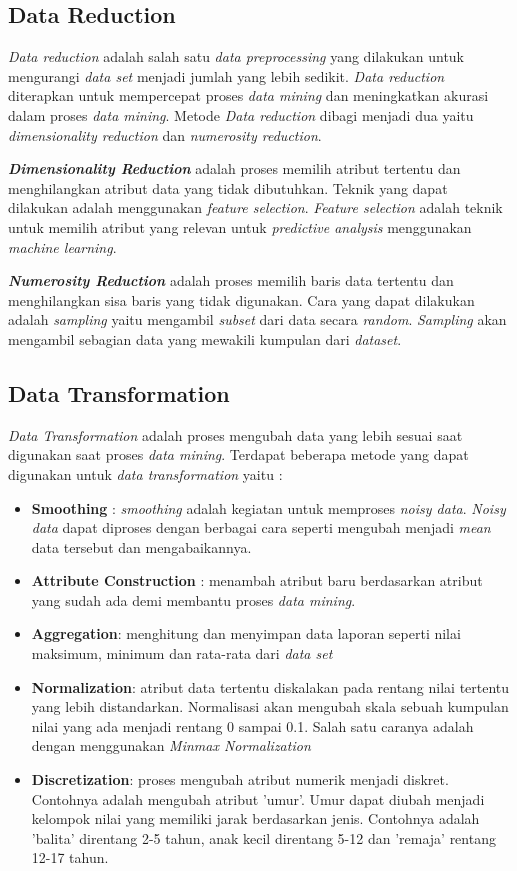 \subsection{Data Reduction} 
\label{chap:datareduction}
\textit{Data reduction} adalah salah satu \textit{data preprocessing} yang dilakukan untuk mengurangi \textit{data set} menjadi jumlah yang lebih sedikit. \textit{Data reduction} diterapkan untuk mempercepat proses \textit{data mining} dan meningkatkan akurasi dalam proses \textit{data mining}. Metode \textit{Data reduction} dibagi menjadi dua yaitu \textit{dimensionality reduction} dan \textit{numerosity reduction}. 

\textbf{\textit{Dimensionality Reduction}} adalah proses memilih atribut tertentu dan menghilangkan atribut data yang tidak dibutuhkan. Teknik yang dapat dilakukan adalah menggunakan \textit{feature selection}. \textit{Feature selection} adalah teknik untuk memilih atribut yang relevan untuk \textit{predictive analysis} menggunakan \textit{machine learning}.

\textbf{\textit{Numerosity Reduction}} adalah proses memilih baris data tertentu dan menghilangkan sisa baris yang tidak digunakan. Cara yang dapat dilakukan adalah \textit{sampling} yaitu mengambil \textit{subset} dari data secara \textit{random}. \textit{Sampling} akan mengambil sebagian data yang mewakili kumpulan dari \textit{dataset}. 

\subsection{Data Transformation}
\label{chap:datatransformation}
\textit{Data Transformation} adalah proses mengubah data yang lebih sesuai saat digunakan saat proses \textit{data mining}. Terdapat beberapa metode yang dapat digunakan untuk \textit{data transformation} yaitu : 

\begin{itemize}
\item \textbf{Smoothing} : \textit{smoothing} adalah kegiatan untuk memproses \textit{noisy data}. \textit{Noisy data} dapat diproses dengan berbagai cara seperti mengubah menjadi \textit{mean} data tersebut dan mengabaikannya.
\item \textbf{Attribute Construction} : menambah atribut baru berdasarkan atribut yang sudah ada demi membantu proses \textit{data mining}. 
\item \textbf{Aggregation}: menghitung dan menyimpan data laporan seperti nilai maksimum, minimum dan rata-rata dari \textit{data set}
\item \textbf{Normalization}: atribut data tertentu diskalakan pada rentang nilai tertentu yang lebih distandarkan. Normalisasi akan mengubah skala sebuah kumpulan nilai yang ada menjadi rentang 0 sampai 0.1. Salah satu caranya adalah dengan menggunakan \textit{Minmax Normalization}
\item \textbf{Discretization}: proses mengubah atribut numerik menjadi diskret. Contohnya adalah mengubah  atribut 'umur'. Umur dapat diubah menjadi kelompok nilai yang memiliki jarak  berdasarkan jenis. Contohnya adalah 'balita' direntang 2-5 tahun, anak kecil direntang 5-12 dan 'remaja' rentang 12-17 tahun. 
\end{itemize}


